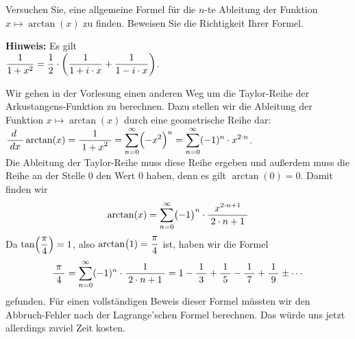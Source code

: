 \exercise
Versuchen Sie, eine allgemeine Formel f\"ur die $n$-te Ableitung der Funktion \\
$x \mapsto \arctan(x)$ 
zu finden.  Beweisen Sie die Richtigkeit Ihrer Formel. 
\vspace*{0.2cm}

\noindent
\textbf{Hinweis:}  Es gilt
\\[0.2cm]
\hspace*{1.3cm}
$\displaystyle\frac{1}{1 + x^2} = \frac{1}{2} \cdot \left(\frac{1}{1 + i \cdot x} + \frac{1}{1 - i \cdot x}\right)$.
\eox
\vspace*{0.2cm}

Wir gehen in der Vorlesung einen anderen Weg um die Taylor-Reihe der Arkustangens-Funktion
zu berechnen.  Dazu  stellen wir
die Ableitung der Funktion $x \mapsto\arctan(x)$ durch eine geometrische Reihe dar: 
\\[0.3cm]
\hspace*{1.3cm}
$\displaystyle\frac{\;\displaystyle d\;\;}{\;\displaystyle dx\;}\arctan(x) = \displaystyle\frac{\;\displaystyle1\;}{\;\displaystyle1+{x}^{2}\;} = \displaystyle \sum\limits_{n=0}^\infty \Bigl(-x^2\Bigr)^n = \sum\limits_{n=0}^\infty (-1)^n \cdot  x^{2\cdot n}$.
\\[0.3cm] 
Die Ableitung der Taylor-Reihe muss diese Reihe ergeben und au{\ss}erdem muss die Reihe an der
Stelle $0$ den Wert $0$ haben, denn es gilt $\arctan(0) = 0$.  Damit finden wir 
\begin{equation}
  \label{eq:taylorArctan}
  \arctan(x) = \sum\limits_{n=0}^\infty \bigl(-1\bigr)^n \cdot  \displaystyle\frac{\;\displaystyle x^{2\cdot n+1}\;}{\;\displaystyle2\cdot n+1\;}
\end{equation}
Da $\displaystyle\tan\Bigl(\frac{\pi}{4}\Bigr) = 1$, also $\displaystyle\arctan\bigl(1) = \frac{\pi}{4}$ ist, haben wir die Formel
\begin{equation}
  \label{eq:PiViertel}
  \displaystyle\frac{\;\displaystyle\pi\;}{\;\displaystyle4\;} = \sum\limits_{n=0}^\infty (-1)^n \cdot  \displaystyle\frac{\;\displaystyle1\;}{\;\displaystyle2\cdot n+1\;} = 
  1 - \displaystyle\frac{\;\displaystyle1\;}{\;\displaystyle3\;} + \displaystyle\frac{\;\displaystyle1\;}{\;\displaystyle5\;} - \displaystyle\frac{\;\displaystyle1\;}{\;\displaystyle7\;} + \displaystyle\frac{\;\displaystyle1\;}{\;\displaystyle9\;} \pm \cdots
\end{equation}
gefunden.  F\"ur einen vollst\"andigen Beweis dieser Formel m\"ussten wir den Abbruch-Fehler
nach der Lagrange'schen Formel berechnen.  Das w\"urde uns jetzt allerdings zuviel Zeit
kosten.

